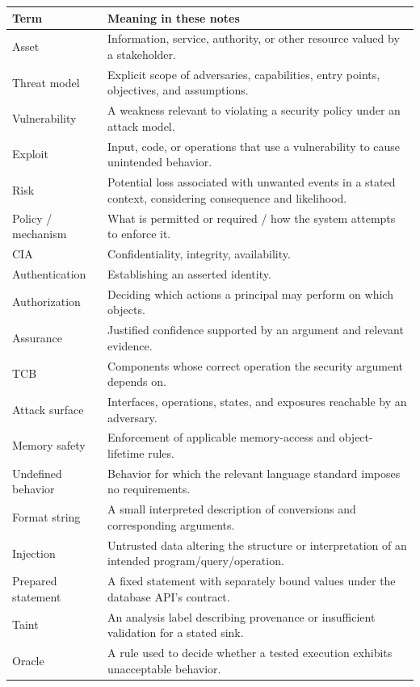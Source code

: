 \documentclass[11pt,a4paper]{article}
\numberwithin{figure}{section}
\begin{document}
\begin{longtable}{@{}>{\raggedright\arraybackslash}p{34mm}>{\raggedright\arraybackslash}p{115mm}@{}}
\toprule Term & Meaning in these notes\\\midrule\endhead
Asset & Information, service, authority, or other resource valued by a stakeholder.\\
Threat model & Explicit scope of adversaries, capabilities, entry points, objectives, and assumptions.\\
Vulnerability & A weakness relevant to violating a security policy under an attack model.\\
Exploit & Input, code, or operations that use a vulnerability to cause unintended behavior.\\
Risk & Potential loss associated with unwanted events in a stated context, considering consequence and likelihood.\\
Policy / mechanism & What is permitted or required / how the system attempts to enforce it.\\
CIA & Confidentiality, integrity, availability.\\
Authentication & Establishing an asserted identity.\\
Authorization & Deciding which actions a principal may perform on which objects.\\
Assurance & Justified confidence supported by an argument and relevant evidence.\\
TCB & Components whose correct operation the security argument depends on.\\
Attack surface & Interfaces, operations, states, and exposures reachable by an adversary.\\
Memory safety & Enforcement of applicable memory-access and object-lifetime rules.\\
Undefined behavior & Behavior for which the relevant language standard imposes no requirements.\\
Format string & A small interpreted description of conversions and corresponding arguments.\\
Injection & Untrusted data altering the structure or interpretation of an intended program/query/operation.\\
Prepared statement & A fixed statement with separately bound values under the database API's contract.\\
Taint & An analysis label describing provenance or insufficient validation for a stated sink.\\
Oracle & A rule used to decide whether a tested execution exhibits unacceptable behavior.\\

\end{longtable}
\end{document}
